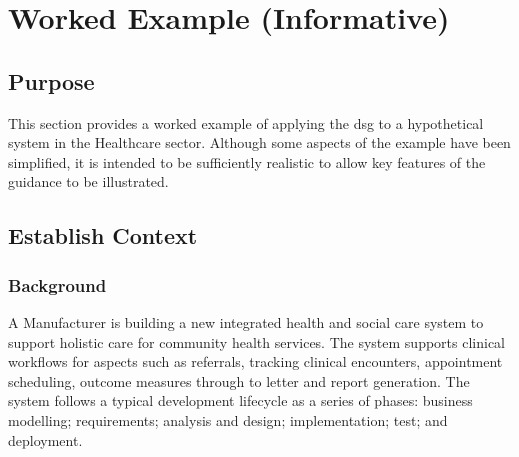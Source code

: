 %
%
\section{Worked Example (Informative)} \label{bkm:workedexample}


\subsection{Purpose}
This section provides a worked example of applying the \gls{dsg} to a hypothetical system in the Healthcare sector. Although some aspects of the example have been simplified, it is intended to be sufficiently realistic to allow key features of the guidance to be illustrated.

\subsection{Establish Context}

\subsubsection{Background}
A Manufacturer is building a new integrated health and social care system to support holistic care for community health services. The system supports clinical workflows for aspects such as referrals, tracking clinical encounters, appointment scheduling, outcome measures through to letter and report generation. The system follows a typical development lifecycle as a series of phases: business modelling; requirements; analysis and design; implementation; test; and deployment. 

